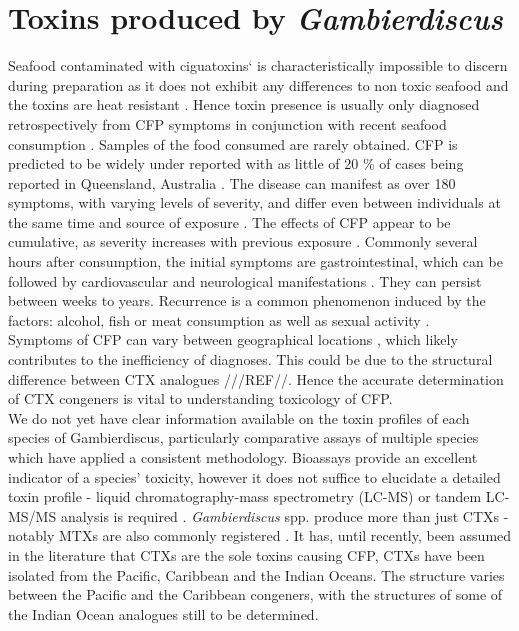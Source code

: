 \documentclass[12pt]{article}
\begin{document}
\section{Toxins produced by \emph{Gambierdiscus}}
Seafood contaminated with ciguatoxins` is characteristically impossible to discern during preparation as it does not exhibit any differences to non toxic seafood and the toxins are heat resistant \cite{withers1982ciguatera}. Hence toxin presence is usually only diagnosed retrospectively from CFP symptoms in conjunction with recent seafood consumption \cite{sims1987theoretical}. Samples of the food consumed are rarely obtained. CFP is predicted to be widely under reported with as little of 20 \% of cases being reported  in Queensland, Australia \cite{lewis2006ciguatera}. The disease can manifest as over 180 symptoms, with varying levels of severity, and differ even between individuals at the same time and source of exposure \cite{sims1987theoretical}. The effects of CFP appear to be cumulative, as severity increases with previous exposure \cite{emerson1983preliminary}. Commonly several hours after consumption, the initial symptoms are gastrointestinal, which can be followed by cardiovascular and neurological manifestations \cite{sims1987theoretical}. They can persist between weeks to years. Recurrence is a common phenomenon induced by the factors: alcohol, fish or meat consumption \cite{lewis2006ciguatera} as well as sexual activity \cite{lange1992travel}. \\
Symptoms of CFP can vary between geographical locations \cite{molgo2000ciguatera,dickey2010ciguatera}, which likely contributes to the inefficiency of diagnoses. This could be due to the structural difference between CTX analogues ///REF//. Hence the accurate determination of CTX congeners is vital to understanding toxicology of CFP.\\

We do not yet have clear information available on the toxin profiles of each species of Gambierdiscus, particularly comparative assays of multiple species which have applied a consistent methodology. Bioassays provide an excellent indicator of a species' toxicity, however it does not suffice to elucidate a detailed toxin profile - liquid chromatography-mass spectrometry (LC-MS) or tandem LC-MS/MS analysis is required \cite{diogened2014chemistry}. \emph{Gambierdiscus} spp. produce more than just CTXs - notably MTXs are also commonly registered \cite{holmes1994purification,murata1993structure}. It has, until recently, been assumed in the literature that CTXs are the sole toxins causing CFP, CTXs have been isolated from the Pacific, Caribbean and the Indian Oceans. The  structure varies between the Pacific and the Caribbean congeners, with the structures of some of the Indian Ocean analogues still to be determined. \\
\end{document}
